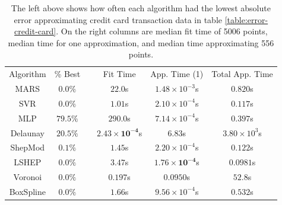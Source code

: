 \documentclass[smallextended,final]{svjour3}       %
\begin{document}
\begin{appendix}
\begin{table}
  \centering
  \begin{tabular}{|c|c| c |c|c|c|}
    \cline{1-2}\cline{4-6}
    Algorithm & \% Best &  & Fit Time & App. Time (1) & Total App. Time\\
    \cline{1-2}\cline{4-6}
    MARS & $0.0\%$ &  & $22.0$s & $1.48 \times 10^{-3}$s & $0.820$s\\
    SVR & $0.0\%$ &  & $1.01$s & $\mathit{2.10 \times 10^{-4}}$s & $\mathit{0.117}$s\\
    MLP & $\mathbf{79.5}\%$ &  & $290.0$s & $7.14 \times 10^{-4}$s & $0.397$s\\
    Delaunay & $\mathit{20.5}\%$ &  & $\mathbf{2.43 \times 10^{-4}}$s & $6.83$s & $3.80 \times 10^{3}$s\\
    ShepMod & $0.1\%$ &  & $1.45$s & $2.20 \times 10^{-4}$s & $0.122$s\\
    LSHEP & $0.0\%$ &  & $3.47$s & $\mathbf{1.76 \times 10^{-4}}$s & $\mathbf{0.0981}$s\\
    Voronoi & $0.0\%$ &  & $\mathit{0.197}$s & $0.0950$s & $52.8$s\\
    BoxSpline & $0.0\%$ &  & $1.66$s & $9.56 \times 10^{-4}$s & $0.532$s\\
    \cline{1-2}\cline{4-6}
  \end{tabular}
  \caption{The left above shows how often each algorithm had the
    lowest absolute error approximating credit card transaction data
    in table \ref{table:error-credit-card}. On the right columns are
    median fit time of 5006 points, median time for one approximation,
    and median time approximating 556 points.}
  \label{table:best-credit-card}
\end{table}




\end{appendix}
\end{document}
